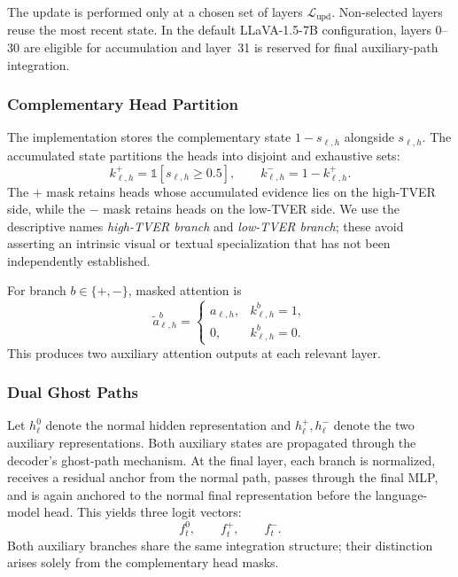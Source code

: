 The update is performed only at a chosen set of layers $\mathcal{L}_{\mathrm{upd}}$. Non-selected layers reuse the most recent state. In the default LLaVA-1.5-7B configuration, layers 0--30 are eligible for accumulation and layer~31 is reserved for final auxiliary-path integration.

\subsubsection{Complementary Head Partition}

The implementation stores the complementary state $1-s_{\ell,h}$ alongside $s_{\ell,h}$. The accumulated state partitions the heads into disjoint and exhaustive sets:
\begin{equation}
k_{\ell,h}^{+}=\mathbb{1}[s_{\ell,h}\geq 0.5],
\qquad
k_{\ell,h}^{-}=1-k_{\ell,h}^{+}.
\label{eq:complementary_masks}
\end{equation}
The $+$ mask retains heads whose accumulated evidence lies on the high-TVER side, while the $-$ mask retains heads on the low-TVER side. We use the descriptive names \emph{high-TVER branch} and \emph{low-TVER branch}; these avoid asserting an intrinsic visual or textual specialization that has not been independently established.

For branch $b\in\{+,-\}$, masked attention is
\begin{equation}
\tilde a_{\ell,h}^{b}
=
\begin{cases}
a_{\ell,h}, & k_{\ell,h}^{b}=1,\\
0, & k_{\ell,h}^{b}=0.
\end{cases}
\end{equation}
This produces two auxiliary attention outputs at each relevant layer.

\subsubsection{Dual Ghost Paths}

Let $h_{\ell}^{0}$ denote the normal hidden representation and $h_{\ell}^{+},h_{\ell}^{-}$ denote the two auxiliary representations. Both auxiliary states are propagated through the decoder's ghost-path mechanism. At the final layer, each branch is normalized, receives a residual anchor from the normal path, passes through the final MLP, and is again anchored to the normal final representation before the language-model head. This yields three logit vectors:
\begin{equation}
f_t^{0},\qquad f_t^{+},\qquad f_t^{-}.
\end{equation}
Both auxiliary branches share the same integration structure; their distinction arises solely from the complementary head masks.

